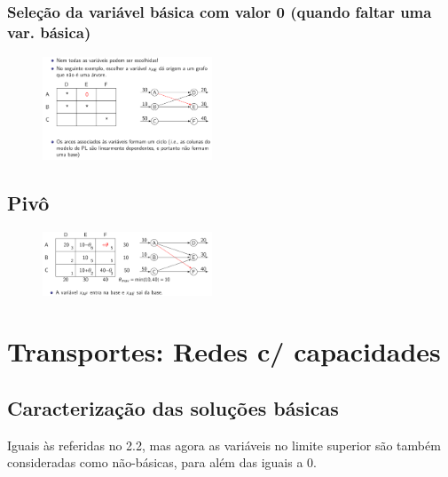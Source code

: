 \documentclass[10pt, a4paper]{article}
\begin{document}
\begin{multicols}{2}
\subsubsection{Seleção da variável básica com valor 0 (quando faltar uma var. básica)}

\begin{figure}[H]
    \centering
    \includegraphics[width=0.45\textwidth]{var_basica_0.png}
\end{figure}

\subsection{Pivô}

\begin{figure}[H]
    \centering
    \includegraphics[width=0.45\textwidth]{bipartidos_pivo.png}
\end{figure}







\section{Transportes: Redes c/ capacidades}

\subsection{Caracterização das soluções básicas}

Iguais às referidas no 2.2, mas agora as variáveis no limite superior são também consideradas como não-básicas, para além das iguais a 0.


\end{multicols}
\end{document}
